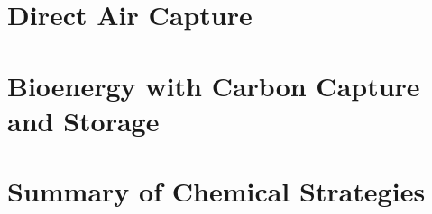 \section{Direct Air Capture}
\section{Bioenergy with Carbon Capture and Storage}
\section{Summary of Chemical Strategies}